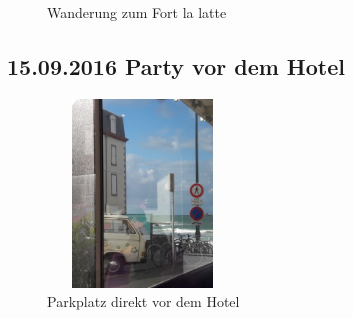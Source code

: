 \begin{figure}[H]
   \centering
   \quad
   \quad
   \quad
   \caption[Wanderung zum Fort la latte]{Wanderung zum Fort la latte}
\end{figure}

\subsection{15.09.2016 Party vor dem Hotel}

\begin{figure} 
  \begin{centering}
    \includegraphics[width=0.45\textwidth, height=5cm, keepaspectratio]{../Bilder/Bretagne/148.jpg}
    \caption{Parkplatz direkt vor dem Hotel}
  \end{centering}
\end{figure} 


